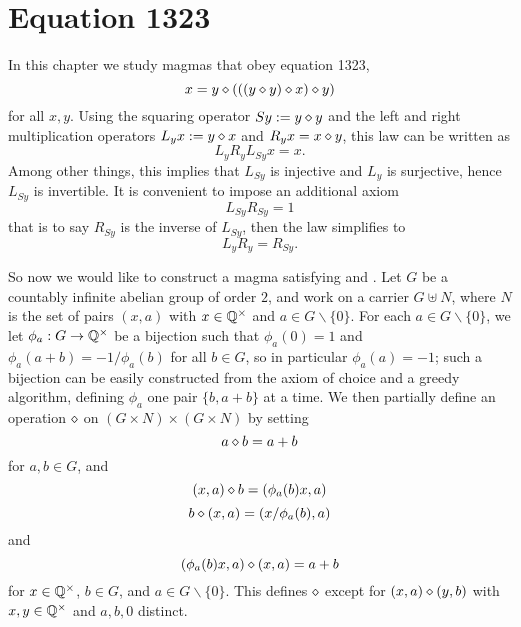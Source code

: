\chapter{Equation 1323}\label{1323-chapter}

In this chapter we study magmas that obey equation 1323,
\begin{equation}\label{1323}
  x = y \diamond (((y \diamond y) \diamond x) \diamond y)
\end{equation}
for all $x,y$.  Using the squaring operator $Sy := y \diamond y$ and the left and right multiplication operators $L_y x := y \diamond x$ and $R_y x = x \diamond y$, this law can be written as
$$ L_y R_y L_{Sy} x = x.$$
Among other things, this implies that $L_{Sy}$ is injective and $L_y$ is surjective, hence $L_{Sy}$ is invertible.  It is convenient to impose an additional axiom
\begin{equation}\label{lr}
 L_{Sy} R_{Sy} = 1
\end{equation}
that is to say $R_{Sy}$ is the inverse of $L_{Sy}$, then the law  simplifies to
\begin{equation}\label{lr-simp}
  L_{y} R_{y} = R_{Sy}.
\end{equation}

 So now we would like to construct a magma satisfying  and .  Let $G$ be a countably infinite abelian group of order $2$, and work on a carrier $G \uplus N$, where $N$ is the set of pairs $(x,a)$ with $x \in \mathbb{Q}^\times$ and $a \in G \backslash \{0\}$.  For each $a \in G \backslash \{0\}$, we let $\phi_a: G \to \mathbb{Q}^\times$ be a bijection such that
 $\phi_a(0) = 1$ and $\phi_a(a+b) = -1/\phi_a(b)$ for all $b \in G$, so in particular $\phi_a(a)=-1$; such a bijection can be easily constructed from the axiom of choice and a greedy algorithm, defining $\phi_a$ one pair $\{b,a+b\}$ at a time. We then partially define an operation $\diamond$ on $(G \times N) \times (G \times N)$ by setting
\begin{equation}\label{op-0}
  a \diamond b = a+b
\end{equation}
for $a,b \in G$, and
 \begin{equation}\label{op-1}
 (x,a) \diamond b = (\phi_a(b) x, a)
\end{equation}
\begin{equation}\label{op-2}
  b \diamond (x,a) = (x / \phi_a(b), a)
\end{equation}
and
\begin{equation}\label{op-3}
  (\phi_a(b) x,a) \diamond (x,a) = a+b
\end{equation}
for $x \in \mathbb{Q}^\times$, $b \in G$, and $a \in G \backslash \{0\}$.  This defines $\diamond$ except for $(x,a) \diamond (y,b)$ with $x,y \in \mathbb{Q}^\times$ and $a,b,0$ distinct.

